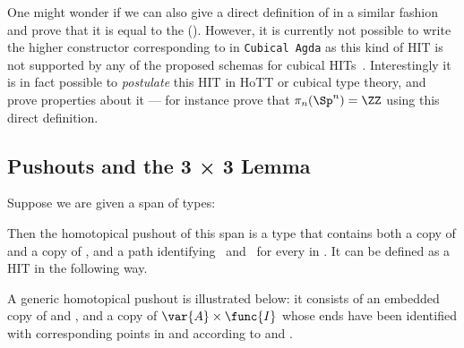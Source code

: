 One might wonder if we can also give a direct definition of
 in a similar fashion and prove that it is equal to the
(). However, it is currently not possible to
write the higher constructor corresponding to  in \texttt{Cubical
Agda} as this kind of HIT is not supported by any of the proposed
schemas for cubical HITs~. Interestingly it
is in fact possible to \emph{postulate} this HIT in HoTT or cubical
type theory, and prove properties about it --- for instance
 prove that $\pi_n(\Sp^n) = \ZZ$ using this direct
definition.

\subsection{Pushouts and the 3 × 3 Lemma}
\label{sec:pushout}

Suppose we are given a span of types:

\begin{center}
\end{center}

Then the homotopical pushout of this span is a type that contains both
a copy of  and a copy of , and a path identifying
\, and \, for every  in .
It can be defined as a HIT in the following way.


A generic homotopical pushout is illustrated below: it consists of an
embedded copy of  and , and a copy of
\( \var{A} \times \func{I} \) whose ends have been identified with
corresponding points in  and  according to  and
.

